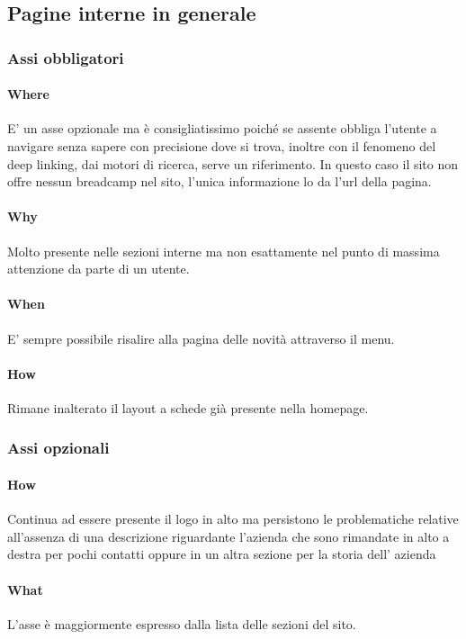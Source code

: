\documentclass[../Relazione.tex]{subfiles}
\begin{document}
    \subsection{Pagine interne in generale}
        \subsubsection{Assi obbligatori}
            \paragraph{Where}
E’ un asse opzionale ma è consigliatissimo poiché se assente obbliga l’utente a navigare senza sapere con precisione dove si trova, inoltre con il fenomeno del deep linking, dai motori di ricerca, serve un riferimento.
In questo caso il sito non offre nessun breadcamp nel sito, l'unica informazione lo da l'url della pagina.
            \paragraph{Why}
Molto presente nelle sezioni interne ma  non esattamente nel punto di massima attenzione da parte di un utente.
            \paragraph{When}
E' sempre possibile risalire alla pagina delle novità attraverso il menu.
            \paragraph{How}
Rimane inalterato il layout a schede già presente nella homepage. 
        
        \subsubsection{Assi opzionali}

            \paragraph{How}
Continua ad essere presente il logo in alto ma persistono le problematiche relative all’assenza di una descrizione riguardante l’azienda che sono rimandate in alto a destra per pochi contatti oppure in un altra sezione per la storia dell' azienda
            \paragraph{What}
            L'asse è maggiormente espresso dalla lista delle sezioni del sito.
\end{document}
